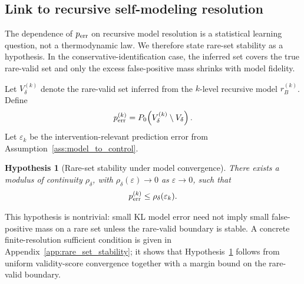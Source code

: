 \documentclass[
  aps,
  prresearch,
  reprint,
  amsmath,
  amssymb,
  superscriptaddress,
  nofootinbib,
  longbibliography
]{revtex4-2}
\def\EQSP{3pt}
\newcommand{\cgather}[2][\EQSP]{\begingroup\setlength\abovedisplayskip{#1}\setlength\belowdisplayskip{#1}\begin{gather} #2 \end{gather}\endgroup\noindent}
\newtheorem{hypothesis}{Hypothesis}
\begin{document}
\subsection{Link to recursive self-modeling resolution}
The dependence of \(p_{\rm err}\) on recursive model resolution is a statistical learning question, not a thermodynamic law. We therefore state rare-set stability as a hypothesis. In the conservative-identification case, the inferred set covers the true rare-valid set and only the excess false-positive mass shrinks with model fidelity.

Let \(V_\delta^{(k)}\) denote the rare-valid set inferred from the \(k\)-level recursive model \(r_B^{(k)}\). Define
\cgather{
p_{\rm err}^{(k)}
=
P_0\!\left(V_\delta^{(k)}\setminus V_\delta\right).
}
Let \(\varepsilon_k\) be the intervention-relevant prediction error from
Assumption~\ref{ass:model_to_control}.
\begin{hypothesis}[Rare-set stability under model convergence]\label{hyp:rare_set_stability}
There exists a modulus of continuity \(\rho_\delta\), with \(\rho_\delta(\varepsilon)\to 0\) as \(\varepsilon\to 0\), such that
\begin{equation}
p_{\rm err}^{(k)}
\le
\rho_\delta(\varepsilon_k).
\end{equation}
\end{hypothesis}
This hypothesis is nontrivial: small KL model error need not imply small false-positive mass on a rare set unless the rare-valid boundary is stable. A concrete finite-resolution sufficient condition is given in Appendix~\ref{app:rare_set_stability}; it shows that Hypothesis~\ref{hyp:rare_set_stability} follows from uniform validity-score convergence together with a margin bound on the rare-valid boundary.
\end{document}
